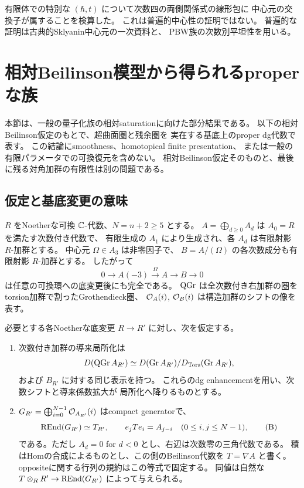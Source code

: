 有限体での特別な $(\hbar,t)$ について次数四の両側関係式の線形包に
中心元の交換子が属することを検算した。
これは普遍的中心性の証明ではない。
普遍的な証明は古典的Sklyanin中心元の一次資料と、
PBW族の次数別平坦性を用いる。

\section{相対Beilinson模型から得られるproperな族}
\label{sec:relative-proper-model}

本節は、一般の量子化族の相対saturationに向けた部分結果である。
以下の相対Beilinson仮定のもとで、超曲面圏と残余圏を
実在する基底上のproper dg代数で表す。
この結論にsmoothness、homotopical finite presentation、
または一般の有限パラメータでの可換復元を含めない。
相対Beilinson仮定そのものと、最後に残る対角加群の有限性は別の問題である。

\subsection{仮定と基底変更の意味}

\(R\) をNoetherな可換 \(\mathbb C\)-代数、\(N=n+2\ge5\) とする。
\(A=\bigoplus_{d\ge0}A_d\) は \(A_0=R\) を満たす次数付き代数で、
有限生成の \(A_1\) により生成され、各 \(A_d\) は有限射影 \(R\)-加群とする。
中心元 \(\Omega\in A_3\) は非零因子で、
\(B=A/(\Omega)\) の各次数成分も有限射影 \(R\)-加群とする。
したがって
\[
 0\longrightarrow A(-3)\xrightarrow{\Omega}A
   \longrightarrow B\longrightarrow0
 \tag{Q}\label{eq:relative-quotient-sequence}
\]
は任意の可換環への底変更後にも完全である。
\(\operatorname{QGr}\) は全次数付き右加群の圏をtorsion加群で割ったGrothendieck圏、
\(\mathcal O_A(i)\), \(\mathcal O_B(i)\) は構造加群のシフトの像を表す。

\begin{definition}[本節の相対Beilinson仮定]\label{def:relative-beilinson-hyp}
 必要とする各Noetherな底変更 \(R\to R'\) に対し、次を仮定する。
 \begin{enumerate}[label=(RB\arabic*)]
 \item 次数付き加群の導来局所化は
 \[
 D(\operatorname{QGr} A_{R'})\simeq
 D(\operatorname{Gr}A_{R'})/
 D_{\operatorname{Tors}}(\operatorname{Gr}A_{R'}),
 \]
 および \(B_{R'}\) に対する同じ表示を持つ。
 これらのdg enhancementを用い、次数シフトと導来係数拡大が
 局所化へ降りるものとする。
 \item \(G_{R'}=\bigoplus_{i=0}^{N-1}\mathcal O_{A_{R'}}(i)\) はcompact generatorで、
 \[
 \operatorname{REnd}(G_{R'})\simeq T_{R'},\qquad
 e_jTe_i=A_{j-i}\quad(0\le i,j\le N-1),
 \tag{B}\label{eq:relative-beilinson-algebra}
 \]
 である。ただし \(A_d=0\) for \(d<0\) とし、右辺は次数零の三角代数である。
 積はHomの合成によるものとし、この側のBeilinson代数を \(T=\nabla A\) と書く。
 oppositeに関する行列の規約はこの等式で固定する。
 同値は自然な \(T\otimes_RR'\to\operatorname{REnd}(G_{R'})\) によって与えられる。
 \end{enumerate}
\end{definition}

